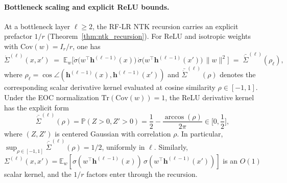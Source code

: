 \paragraph{Bottleneck scaling and explicit ReLU bounds.}
At a bottleneck layer \( \ell \ge 2 \), the RF-LR NTK recursion carries an explicit prefactor \(1/r\) (Theorem~\ref{thm:ntk_recursion}). For ReLU and isotropic weights with \( \mathrm{Cov}(w)=I_r/r \), one has
\[
\dot{\Sigma}^{(\ell)}(x,x') \;=\; \mathbb{E}_w\!\Big[\dot{\sigma}\!\big(w^\top \bm{h}^{(\ell-1)}(x)\big)\,\dot{\sigma}\!\big(w^\top \bm{h}^{(\ell-1)}(x')\big)\,\|w\|^2\Big] \;=\; \bar{\dot{\Sigma}}^{(\ell)}(\rho_\ell),
\]
where \( \rho_\ell = \cos\angle(\bm{h}^{(\ell-1)}(x), \bm{h}^{(\ell-1)}(x')) \) and \( \bar{\dot{\Sigma}}^{(\ell)}(\rho) \) denotes the corresponding scalar derivative kernel evaluated at cosine similarity \( \rho\in[-1,1] \).
Under the EOC normalization \( \mathrm{Tr}(\mathrm{Cov}(w))=1 \), the ReLU derivative kernel has the explicit form
\[
\bar{\dot{\Sigma}}^{(\ell)}(\rho)=\mathbb{P}(Z>0,Z'>0)=\frac{1}{2}-\frac{\arccos(\rho)}{2\pi}\in\Big[0,\frac12\Big],
\]
where \((Z,Z')\) is centered Gaussian with correlation \(\rho\). In particular, \(\sup_{\rho\in[-1,1]}\bar{\dot{\Sigma}}^{(\ell)}(\rho)=1/2\), uniformly in \(\ell\).
Similarly, \( \Sigma^{(\ell)}(x,x')=\mathbb{E}_w[\sigma(w^\top \bm{h}^{(\ell-1)}(x))\,\sigma(w^\top \bm{h}^{(\ell-1)}(x'))] \) is an \(O(1)\) scalar kernel, and the \(1/r\) factors enter through the recursion.

